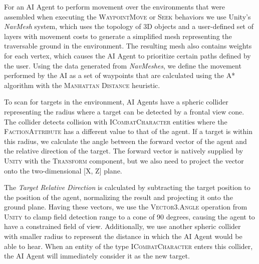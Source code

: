 For an AI Agent to perform movement over the environments that were assembled when executing the \textsc{WaypointMove} or \textsc{Seek} behaviors we use Unity's \emph{NavMesh} system, which uses the topology of 3D objects and a user-defined set of layers with movement costs to generate a simplified mesh representing the traversable ground in the environment. The resulting mesh also contains weights for each vertex, which causes the AI Agent to prioritize certain paths defined by the user. Using the data generated from \emph{NavMeshes}, we define the movement performed by the AI as a set of waypoints that are calculated using the \textsc{A*} algorithm with the \textsc{Manhattan Distance} heuristic.


To scan for targets in the environment, AI Agents have a spheric collider representing the radius where a target can be detected by a frontal view cone. The collider detects collision with \textsc{ICombatCharacter} entities where the \textsc{FactionAttribute} has a different value to that of the agent. If a target is within this radius, we calculate the angle between the forward vector of the agent and the relative direction of the target. The forward vector is natively supplied by \textsc{Unity} with the \textsc{Transform} component, but we also need to project the vector onto the two-dimensional [X, Z] plane.

The \emph{Target Relative Direction} is calculated by subtracting the target position to the position of the agent, normalizing the result and projecting it onto the ground plane. Having these vectors, we use the \textsc{Vector3.Angle} operation from \textsc{Unity} to clamp field detection range to a cone of 90 degrees, causing the agent to have a constrained field of view. Additionally, we use another spheric collider with smaller radius to represent the distance in which the AI Agent would be able to hear. When an entity of the type \textsc{ICombatCharacter} enters this collider, the AI Agent will immediately consider it as the new target.

